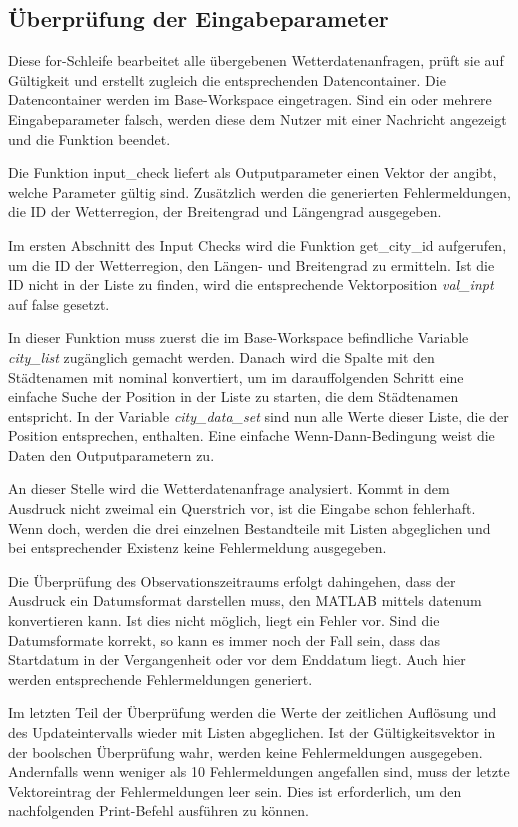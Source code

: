 \subsection{Überprüfung der Eingabeparameter}

Diese for-Schleife bearbeitet alle übergebenen Wetterdatenanfragen, prüft sie auf Gültigkeit und erstellt zugleich die entsprechenden Datencontainer. Die Datencontainer werden im Base-Workspace eingetragen. Sind ein oder mehrere Eingabeparameter falsch, werden diese dem Nutzer mit einer Nachricht angezeigt und die Funktion beendet.

Die Funktion \textsf{input\_check} liefert als Outputparameter einen Vektor der angibt, welche Parameter gültig sind. Zusätzlich werden die generierten Fehlermeldungen, die ID der Wetterregion, der Breitengrad und Längengrad ausgegeben. 

Im ersten Abschnitt des Input Checks wird die Funktion \textsf{get\_city\_id} aufgerufen, um die ID der Wetterregion, den Längen- und Breitengrad zu ermitteln. Ist die ID nicht in der Liste zu finden, wird die entsprechende Vektorposition \textit{val\_inpt} auf false gesetzt.  

In dieser Funktion muss zuerst die im Base-Workspace befindliche Variable \textit{city\_list} zugänglich gemacht werden. Danach wird die Spalte mit den Städtenamen mit \textsf{nominal} konvertiert, um im darauffolgenden Schritt eine einfache Suche der Position in der Liste zu starten, die dem Städtenamen entspricht. In der Variable \textit{city\_data\_set} sind nun alle Werte dieser Liste, die der Position entsprechen, enthalten. Eine einfache Wenn-Dann-Bedingung weist die Daten den Outputparametern zu.   

An dieser Stelle wird die Wetterdatenanfrage analysiert. Kommt in dem Ausdruck nicht zweimal ein Querstrich vor, ist die Eingabe schon fehlerhaft. Wenn doch, werden die drei einzelnen Bestandteile mit Listen abgeglichen und bei entsprechender Existenz keine Fehlermeldung ausgegeben.  

Die Überprüfung des Observationszeitraums erfolgt dahingehen, dass der Ausdruck ein Datumsformat darstellen muss, den MATLAB mittels \textsf{datenum} konvertieren kann. Ist dies nicht möglich, liegt ein Fehler vor. Sind die Datumsformate korrekt, so kann es immer noch der Fall sein, dass das Startdatum in der Vergangenheit oder vor dem Enddatum liegt. Auch hier werden entsprechende Fehlermeldungen generiert.

Im letzten Teil der Überprüfung werden die Werte der zeitlichen Auflösung und des Updateintervalls wieder mit Listen abgeglichen. Ist der Gültigkeitsvektor in der boolschen Überprüfung wahr, werden keine Fehlermeldungen ausgegeben. Andernfalls wenn weniger als 10 Fehlermeldungen angefallen sind, muss der letzte Vektoreintrag der Fehlermeldungen leer sein. Dies ist erforderlich, um den nachfolgenden Print-Befehl ausführen zu können. 
